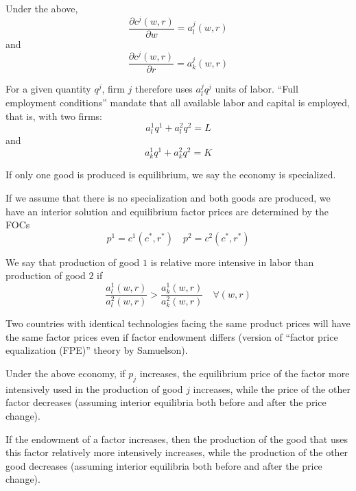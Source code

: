 \begin{lemma}
  Under the above,
  \[
  \frac{\partial c^j(w,r)}{\partial w} = a^j_l(w,r)
  \]
  and
  \[
  \frac{\partial c^j(w,r)}{\partial r} = a^j_k(w,r)
  \]
\end{lemma}

For a given quantity $q^j$, firm $j$ therefore uses $a^j_lq^j$ units
of labor. ``Full employment conditions'' mandate that all available
labor and capital is employed, that is, with two firms:
\[
a^1_l q^1 + a^2_lq^2 = L
\]
and
\[
a^1_k q^1 + a^2_k q^2 = K
\]


\begin{definition}[Specialization]
  If only one good is produced is equilibrium, we say the economy is
  specialized.
\end{definition}

If we assume that there is no specialization and both goods are
produced, we have an interior solution and equilibrium factor prices
are determined by the FOCs
\[
p^1 = c^1(c^*, r^*) \quad p^2 = c^2(c^*, r^*)
\]


\begin{definition}
  We say that production of good $1$ is relative more intensive in
  labor than production of good $2$ if 
  \[
  \frac{a^1_l(w,r)}{a^2_l(w,r)} > \frac{a^1_k(w,r)}{a^2_k(w,r)}
  \quad \forall (w,r)
  \]
\end{definition}


\begin{theorem}[Samuelson 1949]
  Two countries with identical technologies facing the same product
  prices will have the same factor prices even if factor endowment
  differs (version of ``factor price equalization (FPE)'' theory by
  Samuelson).
\end{theorem}

\begin{theorem}
  Under the above economy, if $p_j$ increases, the equilibrium price
  of the factor more intensively used in the production of good $j$
  increases, while the price of the other factor decreases (assuming
  interior equilibria both before and after the price change).
\end{theorem}

\begin{theorem}
  If the endowment of a factor increases, then the production of the
  good that uses this factor relatively more intensively increases,
  while the production of the other good decreases (assuming interior
  equilibria both before and after the price change).
\end{theorem}



